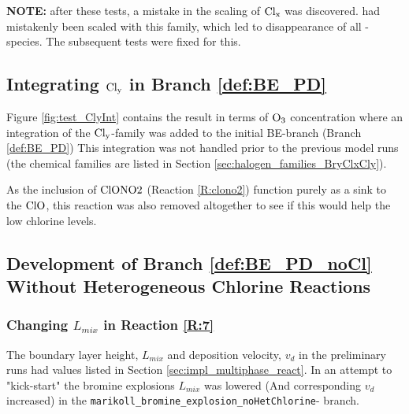 










\textbf{NOTE:} after these tests, a mistake in the scaling of $\mathrm{Cl_x}$ was discovered.  had mistakenly been scaled with this family, which led to disappearance of all -species. The subsequent tests were fixed for this.

\subsection{Integrating $\mathrm{Cl_y}$ in Branch \ref{def:BE_PD}}

Figure \ref{fig:test_ClyInt} contains the result in terms of $\mathrm{O_3}$ concentration where an integration of the $\mathrm{Cl_y}$-family was added to the initial BE-branch (Branch \ref{def:BE_PD}) This integration was not handled prior to the previous model runs (the chemical families are listed in Section \ref{sec:halogen_families_BryClxCly}). 

\medskip

As the inclusion of $\mathrm{ClONO2}$ (Reaction \ref{R:clono2}) function purely as a sink to the $\mathrm{ClO}$, this reaction was also removed altogether to see if this would help the low chlorine levels. 



\subsection{Development of Branch \ref{def:BE_PD_noCl} Without Heterogeneous Chlorine Reactions}



\subsubsection{Changing $L_{mix}$ in Reaction \ref{R:7}}

The boundary layer height, $L_{mix}$ and deposition velocity, $v_d$ in the preliminary runs had values listed in Section \ref{sec:impl_multiphase_react}. In an attempt to "kick-start" the bromine explosions $L_{mix}$ was lowered (And corresponding $v_d$ increased) in the \texttt{marikoll\_bromine\_explosion\_noHetChlorine}- branch. 

